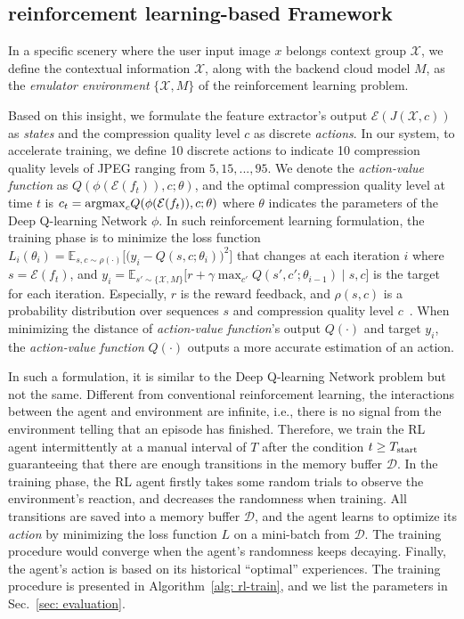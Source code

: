 \subsection{reinforcement learning-based Framework}

In a specific scenery where the user input image $ x $ belongs context group $ \mathcal{X} $, we define the contextual information $ \mathcal{X} $, along with the backend cloud model $ M $, as the \emph{emulator environment} $ \{\mathcal{X}, M\} $ of the reinforcement learning problem. 

Based on this insight, we formulate the feature extractor's output $ \mathcal{E}(J(\mathcal{X}, c)) $ as \emph{states} and the compression quality level $ c $ as discrete \emph{actions}. In our system, to accelerate training, we define 10 discrete actions to indicate 10 compression quality levels of JPEG ranging from $ 5, 15, ...,95 $. We denote the \emph{action-value function} as $ Q(\phi(\mathcal{E}(f_t)), c; \theta) $, and the optimal compression quality level at time $ t $ is $ c_t = {\rm argmax}_cQ(\phi(\mathcal{E}(f_t)), c; \theta) $ where $ \theta $ indicates the parameters of the Deep Q-learning Network $ \phi $. In such reinforcement learning formulation, the training phase is to minimize the loss function $ L_i(\theta_i) = \mathbb{E}_{s, c \sim \rho (\cdot)}\Big[\big(y_i - Q(s, c; \theta_i)\big)^2 \Big] $ that changes at each iteration $ i $ where $ s = \mathcal{E}(f_t) $, and $ y_i = \mathbb{E}_{s' \sim \{\mathcal{X}, M\}} \big[ r + \gamma \max_{c'} Q(s', c'; \theta_{i-1}) \mid s, c \big] $ is the target for each iteration. Especially, $ r $ is the reward feedback, and $ \rho(s, c) $ is a probability distribution over sequences $ s $ and compression quality level $ c $~\cite{DQN}. When minimizing the distance of \emph{action-value function}'s output $ Q(\cdot) $ and target $ y_i $, the \emph{action-value function} $ Q(\cdot) $ outputs a more accurate estimation of an action. 

In such a formulation, it is similar to the Deep Q-learning Network problem but not the same. Different from conventional reinforcement learning, the interactions between the agent and environment are infinite, i.e., there is no signal from the environment telling that an episode has finished. Therefore, we train the RL agent intermittently at a manual interval of $ T $ after the condition $ t \geq T_{\rm start} $ guaranteeing that there are enough transitions in the memory buffer $ \mathcal{D} $. In the training phase, the RL agent firstly takes some random trials to observe the environment's reaction, and decreases the randomness when training. All transitions are saved into a memory buffer $ \mathcal{D} $, and the agent learns to optimize its \emph{action} by minimizing the loss function $ L $ on a mini-batch from $ \mathcal{D} $. The training procedure would converge when the agent's randomness keeps decaying. Finally, the agent's action is based on its historical ``optimal'' experiences. The training procedure is presented in Algorithm~\ref{alg: rl-train}, and we list the parameters in Sec.~\ref{sec: evaluation}.

